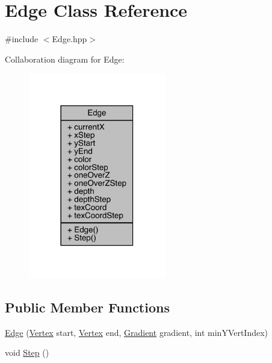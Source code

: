 \hypertarget{class_edge}{}\section{Edge Class Reference}
\label{class_edge}


{\ttfamily \#include $<$Edge.\+hpp$>$}



Collaboration diagram for Edge\+:\nopagebreak
\begin{figure}[H]
\begin{center}
\leavevmode
\includegraphics[width=170pt]{class_edge__coll__graph}
\end{center}
\end{figure}
\subsection*{Public Member Functions}
\begin{DoxyCompactItemize}
\item 
\hyperlink{class_edge_a97a820beb3ce7430825616b227189845}{Edge} (\hyperlink{struct_vertex}{Vertex} start, \hyperlink{struct_vertex}{Vertex} end, \hyperlink{class_gradient}{Gradient} gradient, int min\+Y\+Vert\+Index)
\item 
void \hyperlink{class_edge_aee421bbd01b0ac8006e91e76589e84fb}{Step} ()
\end{DoxyCompactItemize}
